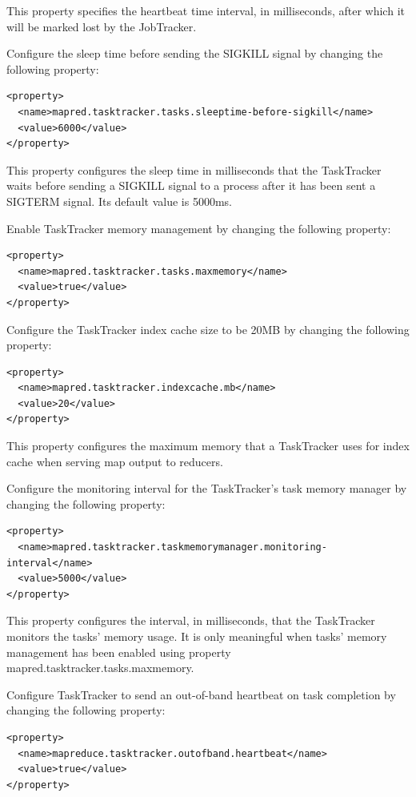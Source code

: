 This property specifies the heartbeat time interval, in milliseconds, after which it will be marked lost by the JobTracker.


Configure the sleep time before sending the SIGKILL signal by changing the following property:
\lstset{style=bashstyle}
\begin{lstlisting}
<property>
  <name>mapred.tasktracker.tasks.sleeptime-before-sigkill</name>
  <value>6000</value>
</property>
\end{lstlisting}

This property configures the sleep time in milliseconds that the TaskTracker waits before sending a SIGKILL signal to a process after it has been sent a SIGTERM signal. Its default value is 5000ms.


Enable TaskTracker memory management by changing the following property:
\lstset{style=bashstyle}
\begin{lstlisting}
<property>
  <name>mapred.tasktracker.tasks.maxmemory</name>
  <value>true</value>
</property>
\end{lstlisting}

Configure the TaskTracker index cache size to be 20MB by changing the following property:
\lstset{style=bashstyle}
\begin{lstlisting}
<property>
  <name>mapred.tasktracker.indexcache.mb</name>
  <value>20</value>
</property>
\end{lstlisting}

This property configures the maximum memory that a TaskTracker uses for index cache when serving map output to reducers.


Configure the monitoring interval for the TaskTracker's task memory manager by changing the following property:
\lstset{style=bashstyle}
\begin{lstlisting}
<property>
  <name>mapred.tasktracker.taskmemorymanager.monitoring-interval</name>
  <value>5000</value>
</property>
\end{lstlisting}
This property configures the interval, in milliseconds, that the TaskTracker monitors the tasks' memory usage. It is only meaningful when tasks' memory management has been enabled using property mapred.tasktracker.tasks.maxmemory.


Configure TaskTracker to send an out-of-band heartbeat on task completion by changing the following property:
\lstset{style=bashstyle}
\begin{lstlisting}
<property>
  <name>mapreduce.tasktracker.outofband.heartbeat</name>
  <value>true</value>
</property>
\end{lstlisting}

